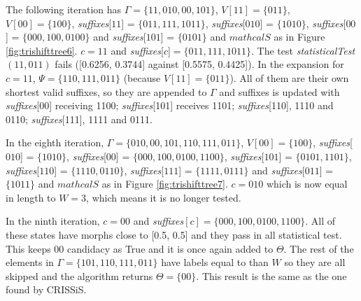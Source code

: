 {The following iteration has $\Gamma = \{11, 010, 00, 101\}$, $V[11] = \{011\}$, $V[00] = \{100\}$, \textit{suffixes}[$11$] = $\{011, 111, 1011\}$,  \textit{suffixes}[$010$] = $\{1010\}$, \textit{suffixes}[$00$] = $\{000, 100, 0100\}$ and \textit{suffixes}[$101$] = $\{0101\}$ and $mathcal{S}$ as in Figure \ref{fig:trishifttree6}. $c = 11$ and \textit{suffixes}[$c$]$ = \{011, 111, 1011\}$. The test \textit{statisticalTest}$(11,011)$ fails ([0.6256, 0.3744] against [0.5575, 0.4425]). In the expansion for $c = 11$, $\Psi = \{110, 111, 011\}$ (because $V[11] = \{011\}$).  All of them are their own shortest valid suffixes, so they are appended to $\Gamma$ and suffixes is updated with \textit{suffixes}[00] receiving 1100; \textit{suffixes}[101] receives 1101; \textit{suffixes}[110], 1110 and 0110; \textit{suffixes}[111], 1111 and 0111.

In the eighth iteration, $\Gamma = \{010, 00, 101, 110, 111, 011\}$, $V[00] = \{100\}$, \textit{suffixes}[$010$] = $\{1010\}$, \textit{suffixes}[$00$] = $\{000, 100, 0100, 1100\}$, \textit{suffixes}[$101$] = $\{0101, 1101\}$, \textit{suffixes}[$110$] = $\{1110, 0110\}$, \textit{suffixes}[$111$] = $\{1111, 0111\}$ and \textit{suffixes}[$011$] = $\{1011\}$ and $mathcal{S}$ as in Figure \ref{fig:trishifttree7}. $c = 010$ which is now equal in length to $W = 3$, which means it is no longer tested.

In the ninth iteration, $c = 00$ and \textit{suffixes}$[c] = \{000, 100, 0100, 1100\}$. All of these states have morphs close to [0.5, 0.5] and they pass in all statistical test. This keeps 00 candidacy as True and it is once again added to $\Theta$. The rest of the elements in $\Gamma = \{101, 110, 111, 011\}$ have labels equal to than $W$ so they are all skipped and the algorithm returns $\Theta = \{00\}$. This result is the same as the one found by CRISSiS. %

}
